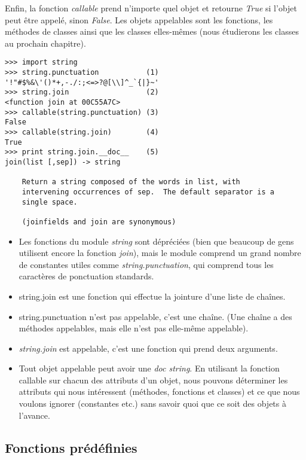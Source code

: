 Enfin, la fonction \emph{callable} prend n’importe quel objet et retourne \emph{True} si l’objet peut être appelé, sinon \emph{False}. Les objets appelables sont les fonctions, les méthodes de classes ainsi que les classes elles-mêmes (nous étudierons les classes au prochain chapitre).

\begin{example}
\begin{lstlisting}
>>> import string
>>> string.punctuation           (1)
'!"#$%&\'()*+,-./:;<=>?@[\\]^_`{|}~'
>>> string.join                  (2)
<function join at 00C55A7C>
>>> callable(string.punctuation) (3)
False
>>> callable(string.join)        (4)
True
>>> print string.join.__doc__    (5)
join(list [,sep]) -> string

    Return a string composed of the words in list, with
    intervening occurrences of sep.  The default separator is a
    single space.

    (joinfields and join are synonymous)
\end{lstlisting}
\end{example}

\begin{itemize}
    \item{Les fonctions du module \emph{string} sont dépréciées (bien que beaucoup de gens utilisent encore la fonction \emph{join}), mais le module comprend un grand nombre de constantes utiles comme \emph{string.punctuation}, qui comprend tous les caractères de ponctuation standards.}
    \item{string.join est une fonction qui effectue la jointure d’une liste de chaînes.}
    \item{string.punctuation n’est pas appelable, c’est une chaîne. (Une chaîne a des méthodes appelables, mais elle n’est pas elle-même appelable).}
    \item{\emph{string.join} est appelable, c’est une fonction qui prend deux arguments.}
    \item{Tout objet appelable peut avoir une \emph{doc string}. En utilisant la fonction callable sur chacun des attributs d’un objet, nous pouvons déterminer les attributs qui nous intéressent (méthodes, fonctions et classes) et ce que nous voulons ignorer (constantes etc.) sans savoir quoi que ce soit des objets à l’avance.}
\end{itemize}

\subsection{Fonctions prédéfinies}

